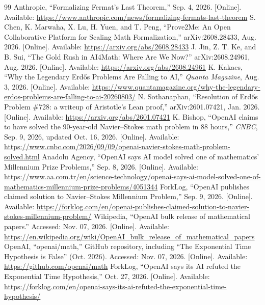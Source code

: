 \documentclass{article}
\begin{document}
\begin{thebibliography}{99}
 Anthropic, ``Formalizing Fermat's Last Theorem,'' Sep. 4, 2026. [Online]. Available: \url{https://www.anthropic.com/news/formalizing-fermats-last-theorem}
 S. Chen, K. Marwaha, X. Lu, H. Yuen, and T. Peng, ``Prove2Me: An Open Collaborative Platform for Scaling Math Formalization,'' arXiv:2608.28433, Aug. 2026. [Online]. Available: \url{https://arxiv.org/abs/2608.28433}
 J. Jin, Z. T. Ke, and B. Sui, ``The Gold Rush in AI4Math: Where Are We Now?'' arXiv:2608.24961, Aug. 2026. [Online]. Available: \url{https://arxiv.org/abs/2608.24961}
 K. Kakaes, ``Why the Legendary Erdős Problems Are Falling to AI,'' \emph{Quanta Magazine}, Aug. 3, 2026. [Online]. Available: \url{https://www.quantamagazine.org/why-the-legendary-erdos-problems-are-falling-to-ai-20260803/}
 N. Sothanaphan, ``Resolution of Erdős Problem \#728: a writeup of Aristotle's Lean proof,'' arXiv:2601.07421, Jan. 2026. [Online]. Available: \url{https://arxiv.org/abs/2601.07421}
 K. Bishop, ``OpenAI claims to have solved the 90-year-old Navier--Stokes math problem in 88 hours,'' \emph{CNBC}, Sep. 9, 2026, updated Oct. 16, 2026. [Online]. Available: \url{https://www.cnbc.com/2026/09/09/openai-navier-stokes-math-problem-solved.html}
 Anadolu Agency, ``OpenAI says AI model solved one of mathematics' Millennium Prize Problems,'' Sep. 8, 2026. [Online]. Available: \url{https://www.aa.com.tr/en/science-technology/openai-says-ai-model-solved-one-of-mathematics-millennium-prize-problems/4051344}
 ForkLog, ``OpenAI publishes claimed solution to Navier--Stokes Millennium Problem,'' Sep. 9, 2026. [Online]. Available: \url{https://forklog.com/en/openai-publishes-claimed-solution-to-navier-stokes-millennium-problem/}
 Wikipedia, ``OpenAI bulk release of mathematical papers.'' Accessed: Nov. 07, 2026. [Online]. Available: \url{https://en.wikipedia.org/wiki/OpenAI_bulk_release_of_mathematical_papers}
 OpenAI, ``openai/math,'' GitHub repository, including ``The Exponential Time Hypothesis is False'' (Oct. 2026). Accessed: Nov. 07, 2026. [Online]. Available: \url{https://github.com/openai/math}
 ForkLog, ``OpenAI says its AI refuted the Exponential Time Hypothesis,'' Oct. 27, 2026. [Online]. Available: \url{https://forklog.com/en/openai-says-its-ai-refuted-the-exponential-time-hypothesis/}

\end{thebibliography}
\end{document}
